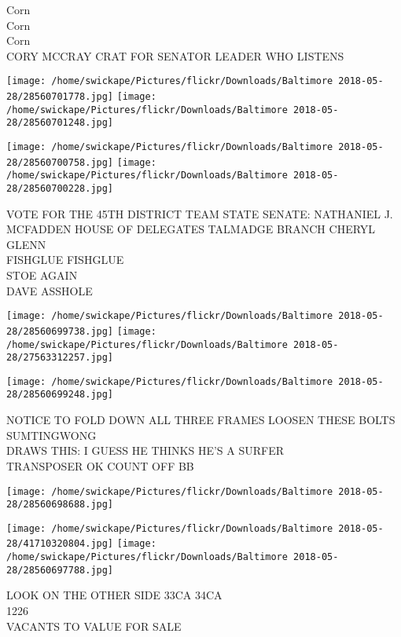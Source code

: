 \documentclass[10pt,letterpaper]{article}
\begin{document}
Corn\\
Corn\\
Corn\\
CORY MCCRAY CRAT FOR SENATOR LEADER WHO LISTENS\\
\pagebreak

\texttt{[image: /home/swickape/Pictures/flickr/Downloads/Baltimore 2018-05-28/28560701778.jpg]}
\texttt{[image: /home/swickape/Pictures/flickr/Downloads/Baltimore 2018-05-28/28560701248.jpg]}

\texttt{[image: /home/swickape/Pictures/flickr/Downloads/Baltimore 2018-05-28/28560700758.jpg]}
\texttt{[image: /home/swickape/Pictures/flickr/Downloads/Baltimore 2018-05-28/28560700228.jpg]}

VOTE FOR THE 45TH DISTRICT TEAM STATE SENATE: NATHANIEL J. MCFADDEN HOUSE OF DELEGATES TALMADGE BRANCH CHERYL GLENN\\
FISHGLUE FISHGLUE\\
STOE AGAIN\\
DAVE ASSHOLE\\
\pagebreak

\texttt{[image: /home/swickape/Pictures/flickr/Downloads/Baltimore 2018-05-28/28560699738.jpg]}
\texttt{[image: /home/swickape/Pictures/flickr/Downloads/Baltimore 2018-05-28/27563312257.jpg]}

\texttt{[image: /home/swickape/Pictures/flickr/Downloads/Baltimore 2018-05-28/28560699248.jpg]}

NOTICE TO FOLD DOWN ALL THREE FRAMES LOOSEN THESE BOLTS SUMTINGWONG\\
DRAWS THIS: I GUESS HE THINKS HE'S A SURFER\\
TRANSPOSER OK COUNT OFF BB\\
\pagebreak

\texttt{[image: /home/swickape/Pictures/flickr/Downloads/Baltimore 2018-05-28/28560698688.jpg]}

\vspace{0.25in}
\texttt{[image: /home/swickape/Pictures/flickr/Downloads/Baltimore 2018-05-28/41710320804.jpg]}
\texttt{[image: /home/swickape/Pictures/flickr/Downloads/Baltimore 2018-05-28/28560697788.jpg]}

LOOK ON THE OTHER SIDE 33CA 34CA\\
1226\\
VACANTS TO VALUE FOR SALE\\
\pagebreak
\end{document}

